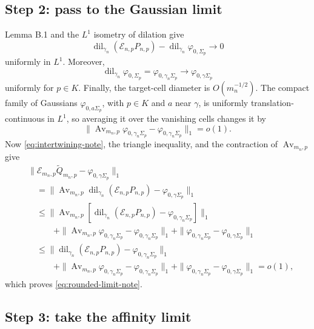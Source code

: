 \documentclass[11pt]{article}
\begin{document}
\subsection*{Step 2: pass to the Gaussian limit}

Lemma B.1 and the $L^1$ isometry of dilation give
\[
  \operatorname{dil}_{\gamma_n}
  (\mathcal E_{n,p}P_{n,p})
  -\operatorname{dil}_{\gamma_n}\varphi_{0,\Sigma_p}
  \longrightarrow0
\]
uniformly in $L^1$.  Moreover,
\[
  \operatorname{dil}_{\gamma_n}\varphi_{0,\Sigma_p}
  =\varphi_{0,\gamma_n\Sigma_p}
  \longrightarrow\varphi_{0,\gamma\Sigma_p}
\]
uniformly for $p\in K$.  Finally, the target-cell diameter is
$O(m_n^{-1/2})$.  The compact family of Gaussians
$\varphi_{0,a\Sigma_p}$, with $p\in K$ and $a$ near $\gamma$, is uniformly
translation-continuous in $L^1$, so averaging it over the vanishing cells
changes it by
\[
  \|\operatorname{Av}_{m_n,p}\varphi_{0,\gamma_n\Sigma_p}
    -\varphi_{0,\gamma_n\Sigma_p}\|_1=o(1).
\]
Now \eqref{eq:intertwining-note}, the triangle inequality, and the
contraction of $\operatorname{Av}_{m_n,p}$ give
\[
\begin{aligned}
  &\|\mathcal E_{m_n,p}\widetilde Q_{m_n,p}
       -\varphi_{0,\gamma\Sigma_p}\|_1\\
  &\quad=\|\operatorname{Av}_{m_n,p}\operatorname{dil}_{\gamma_n}
       (\mathcal E_{n,p}P_{n,p})
       -\varphi_{0,\gamma\Sigma_p}\|_1\\
  &\quad\le
       \|\operatorname{Av}_{m_n,p}
       [\operatorname{dil}_{\gamma_n}(\mathcal E_{n,p}P_{n,p})
       -\varphi_{0,\gamma_n\Sigma_p}]\|_1\\
  &\qquad\quad
       +\|\operatorname{Av}_{m_n,p}\varphi_{0,\gamma_n\Sigma_p}
       -\varphi_{0,\gamma_n\Sigma_p}\|_1
       +\|\varphi_{0,\gamma_n\Sigma_p}
       -\varphi_{0,\gamma\Sigma_p}\|_1\\
  &\quad\le
       \|\operatorname{dil}_{\gamma_n}(\mathcal E_{n,p}P_{n,p})
       -\varphi_{0,\gamma_n\Sigma_p}\|_1\\
  &\qquad\quad
       +\|\operatorname{Av}_{m_n,p}\varphi_{0,\gamma_n\Sigma_p}
       -\varphi_{0,\gamma_n\Sigma_p}\|_1
       +\|\varphi_{0,\gamma_n\Sigma_p}
       -\varphi_{0,\gamma\Sigma_p}\|_1=o(1),
\end{aligned}
\]
which proves \eqref{eq:rounded-limit-note}.

\subsection*{Step 3: take the affinity limit}
\end{document}
